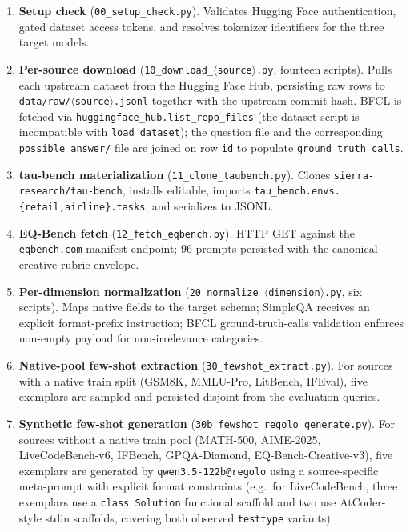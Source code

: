 \documentclass[11pt,a4paper]{article}
\begin{document}
\begin{enumerate}[leftmargin=*,itemsep=2pt]
  \item \textbf{Setup check} (\texttt{00\_setup\_check.py}). Validates Hugging Face authentication, gated dataset access tokens, and resolves tokenizer identifiers for the three target models.
  \item \textbf{Per-source download} (\texttt{10\_download\_$\langle$source$\rangle$.py}, fourteen scripts). Pulls each upstream dataset from the Hugging Face Hub, persisting raw rows to \texttt{data/raw/$\langle$source$\rangle$.jsonl} together with the upstream commit hash. BFCL is fetched via \texttt{huggingface\_hub.list\_repo\_files} (the dataset script is incompatible with \texttt{load\_dataset}); the question file and the corresponding \texttt{possible\_answer/} file are joined on row \texttt{id} to populate \texttt{ground\_truth\_calls}.
  \item \textbf{tau-bench materialization} (\texttt{11\_clone\_taubench.py}). Clones \texttt{sierra-research/tau-bench}, installs editable, imports \texttt{tau\_bench.envs.\{retail,airline\}.tasks}, and serializes to JSONL.
  \item \textbf{EQ-Bench fetch} (\texttt{12\_fetch\_eqbench.py}). HTTP GET against the \texttt{eqbench.com} manifest endpoint; 96 prompts persisted with the canonical creative-rubric envelope.
  \item \textbf{Per-dimension normalization} (\texttt{20\_normalize\_$\langle$dimension$\rangle$.py}, six scripts). Maps native fields to the target schema; SimpleQA receives an explicit format-prefix instruction; BFCL ground-truth-calls validation enforces non-empty payload for non-irrelevance categories.
  \item \textbf{Native-pool few-shot extraction} (\texttt{30\_fewshot\_extract.py}). For sources with a native train split (GSM8K, MMLU-Pro, LitBench, IFEval), five exemplars are sampled and persisted disjoint from the evaluation queries.
  \item \textbf{Synthetic few-shot generation} (\texttt{30b\_fewshot\_regolo\_generate.py}). For sources without a native train pool (MATH-500, AIME-2025, LiveCodeBench-v6, IFBench, GPQA-Diamond, EQ-Bench-Creative-v3), five exemplars are generated by \texttt{qwen3.5-122b@regolo} using a source-specific meta-prompt with explicit format constraints (e.g.\ for LiveCodeBench, three exemplars use a \texttt{class Solution} functional scaffold and two use AtCoder-style stdin scaffolds, covering both observed \texttt{testtype} variants).

\end{enumerate}
\end{document}
